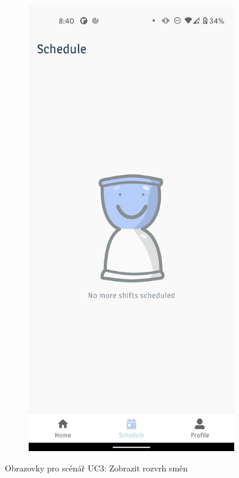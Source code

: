 \documentclass[twoside]{ctuthesis}
\begin{document}
\begin{figure}[ht]
	\begin{subfigure}[h!]{.5\textwidth}
		\centering
		\includegraphics[width=.9\linewidth]{img/uc3-schedule-empty.jpg}
		\label{fig:uc2-schedule-app-empty}
	\end{subfigure}
	\caption{Obrazovky pro scénář UC3: Zobrazit rozvrh směn}
\end{figure}
\end{document}
